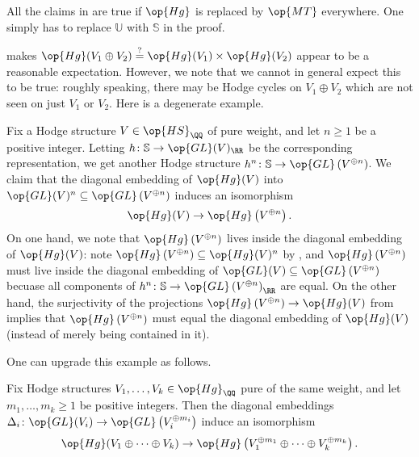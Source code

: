 \documentclass[../thesis.tex]{subfiles}
\begin{document}
\begin{remark}
	All the claims in  are true if $\op{Hg}$ is replaced by $\op{MT}$ everywhere. One simply has to replace $\mathbb U$ with $\mathbb S$ in the proof.
\end{remark}
 makes $\op{Hg}(V_1\oplus V_2)\stackrel?=\op{Hg}(V_1)\times\op{Hg}(V_2)$ appear to be a reasonable expectation. However, we note that we cannot in general expect this to be true: roughly speaking, there may be Hodge cycles on $V_1\oplus V_2$ which are not seen on just $V_1$ or $V_2$. Here is a degenerate example.
\begin{example} \label{ex:diagonal-hodge-group}
	Fix a Hodge structure $V\in\op{HS}_\QQ$ of pure weight, and let $n\ge1$ be a positive integer. Letting $h\colon\mathbb S\to\op{GL}(V)_\RR$ be the corresponding representation, we get another Hodge structure $h^{n}\colon\mathbb S\to\op{GL}\left(V^{\oplus n}\right)$. We claim that the diagonal embedding of $\op{Hg}(V)$ into $\op{GL}(V)^n\subseteq\op{GL}\left(V^{\oplus n}\right)$ induces an isomorphism
	\[\op{Hg}(V)\to\op{Hg}\left(V^{\oplus n}\right).\]
	On one hand, we note that $\op{Hg}\left(V^{\oplus n}\right)$ lives inside the diagonal embedding of $\op{Hg}(V)$: note $\op{Hg}\left(V^{\oplus n}\right)\subseteq\op{Hg}(V)^n$ by , and $\op{Hg}\left(V^{\oplus n}\right)$ must live inside the diagonal embedding of $\op{GL}(V)\subseteq\op{GL}\left(V^{\oplus n}\right)$ becuase all components of $h^n\colon\mathbb S\to\op{GL}\left(V^{\oplus n}\right)_\RR$ are equal. On the other hand, the surjectivity of the projections $\op{Hg}\left(V^{\oplus n}\right)\to\op{Hg}(V)$ from  implies that $\op{Hg}\left(V^{\oplus n}\right)$ must equal the diagonal embedding of $\op{Hg}(V)$ (instead of merely being contained in it).
\end{example}
One can upgrade this example as follows.
\begin{lemma} \label{lem:hg-isotypic}
	Fix Hodge structures $V_1,\ldots,V_k\in\op{Hg}_\QQ$ pure of the same weight, and let $m_1,\ldots,m_k\ge1$ be positive integers. Then the diagonal embeddings $\Delta_i\colon\op{GL}(V_i)\to\op{GL}\left(V_i^{\oplus m_i}\right)$ induce an isomorphism
	\[\op{Hg}(V_1\oplus\cdots\oplus V_k)\to\op{Hg}\left(V_1^{\oplus m_1}\oplus\cdots\oplus V_k^{\oplus m_k}\right).\]
\end{lemma}
\end{document}
